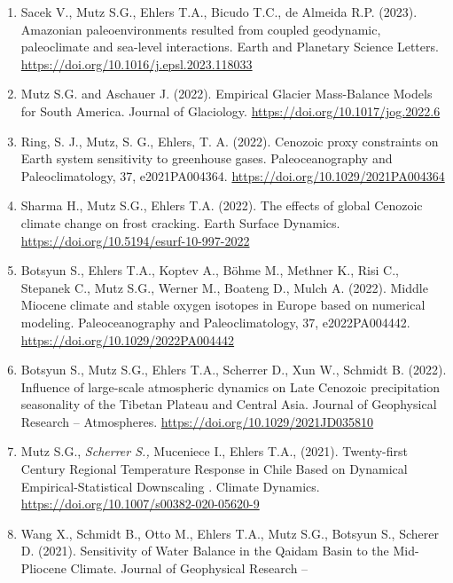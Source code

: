 \documentclass[
  letterpaper,
  DIV=11,
  numbers=noendperiod]{scrartcl}
\begin{document}
\begin{enumerate}
  Boateng, D., Mutz, S. G., Ballian, A., Meijers, M. J. M., Methner, K.,
  Botsyun, S., Mulch, A., and Ehlers, T. A. (2023). The effects of
  diachronous surface uplift of the European Alps on regional climate
  and the oxygen isotopic composition of precipitation. Earth System
  Dynamics. \url{https://doi.org/10.5194/esd-14-1183-2023}
\item
  Sacek V., Mutz S.G., Ehlers T.A., Bicudo T.C., de Almeida R.P. (2023).
  Amazonian paleoenvironments resulted from coupled geodynamic,
  paleoclimate and sea-level interactions. Earth and Planetary Science
  Letters. \url{https://doi.org/10.1016/j.epsl.2023.118033}
\item
  Mutz S.G. and Aschauer J. (2022). Empirical Glacier Mass-Balance
  Models for South America. Journal of Glaciology.
  \url{https://doi.org/10.1017/jog.2022.6}
\item
  Ring, S. J., Mutz, S. G., Ehlers, T. A. (2022). Cenozoic proxy
  constraints on Earth system sensitivity to greenhouse gases.
  Paleoceanography and Paleoclimatology, 37, e2021PA004364.
  \url{https://doi.org/10.1029/2021PA004364}
\item
  Sharma H., Mutz S.G., Ehlers T.A. (2022). The effects of global
  Cenozoic climate change on frost cracking. Earth Surface Dynamics.
  \url{https://doi.org/10.5194/esurf-10-997-2022}
\item
  Botsyun S., Ehlers T.A., Koptev A., Böhme M., Methner K., Risi C.,
  Stepanek C., Mutz S.G., Werner M., Boateng D., Mulch A. (2022). Middle
  Miocene climate and stable oxygen isotopes in Europe based on
  numerical modeling. Paleoceanography and Paleoclimatology, 37,
  e2022PA004442. \url{https://doi.org/10.1029/2022PA004442}
\item
  Botsyun S., Mutz S.G., Ehlers T.A., Scherrer D., Xun W., Schmidt B.
  (2022). Influence of large-scale atmospheric dynamics on Late Cenozoic
  precipitation seasonality of the Tibetan Plateau and Central Asia.
  Journal of Geophysical Research -- Atmospheres.
  \url{https://doi.org/10.1029/2021JD035810}
\item
  Mutz S.G., \emph{Scherrer S., }Muceniece I., Ehlers T.A., (2021).
  Twenty-first Century Regional Temperature Response in Chile Based on
  Dynamical Empirical-Statistical Downscaling . Climate Dynamics.
  \url{https://doi.org/10.1007/s00382-020-05620-9}
\item
  Wang X., Schmidt B., Otto M., Ehlers T.A., Mutz S.G., Botsyun S.,
  Scherer D. (2021). Sensitivity of Water Balance in the Qaidam Basin to
  the Mid-Pliocene Climate. Journal of Geophysical Research --

\end{enumerate}
\end{document}
